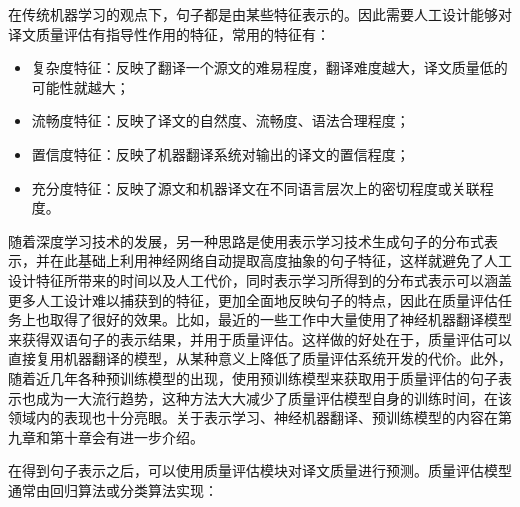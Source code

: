 \parinterval 在传统机器学习的观点下，句子都是由某些特征表示的。因此需要人工设计能够对译文质量评估有指导性作用的特征，常用的特征有：

\begin{itemize}
\vspace{0.5em}
\item 复杂度特征：反映了翻译一个源文的难易程度，翻译难度越大，译文质量低的可能性就越大；
\vspace{0.5em}
\item 流畅度特征：反映了译文的自然度、流畅度、语法合理程度；
\vspace{0.5em}
\item 置信度特征：反映了机器翻译系统对输出的译文的置信程度；
\vspace{0.5em}
\item 充分度特征：反映了源文和机器译文在不同语言层次上的密切程度或关联程度。
\vspace{0.5em}
\end{itemize}

\parinterval 随着深度学习技术的发展，另一种思路是使用表示学习技术生成句子的分布式表示，并在此基础上利用神经网络自动提取高度抽象的句子特征，这样就避免了人工设计特征所带来的时间以及人工代价，同时表示学习所得到的分布式表示可以涵盖更多人工设计难以捕获到的特征，更加全面地反映句子的特点，因此在质量评估任务上也取得了很好的效果。比如，最近的一些工作中大量使用了神经机器翻译模型来获得双语句子的表示结果，并用于质量评估。这样做的好处在于，质量评估可以直接复用机器翻译的模型，从某种意义上降低了质量评估系统开发的代价。此外，随着近几年各种预训练模型的出现，使用预训练模型来获取用于质量评估的句子表示也成为一大流行趋势，这种方法大大减少了质量评估模型自身的训练时间，在该领域内的表现也十分亮眼。关于表示学习、神经机器翻译、预训练模型的内容在第九章和第十章会有进一步介绍。

\parinterval 在得到句子表示之后，可以使用质量评估模块对译文质量进行预测。质量评估模型通常由回归算法或分类算法实现：

